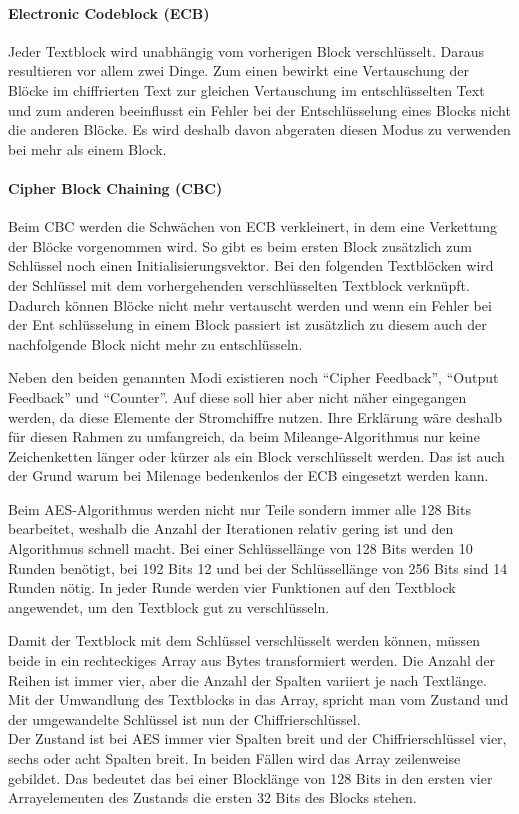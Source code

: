   \paragraph{Electronic Codeblock (ECB)}
   Jeder Textblock wird unabhängig vom vorherigen Block verschlüsselt. Daraus resultieren vor allem
   zwei Dinge. Zum einen bewirkt eine Vertauschung der Blöcke im chiffrierten Text zur gleichen Vertauschung
   im entschlüsselten Text und zum anderen beeinflusst ein Fehler bei der Entschlüsselung eines Blocks
   nicht die anderen Blöcke. Es wird deshalb davon abgeraten diesen Modus zu verwenden bei mehr
   als einem Block.

  \paragraph{Cipher Block Chaining (CBC)}
   Beim CBC werden die Schwächen von ECB verkleinert, in dem eine Verkettung der Blöcke vorgenommen
   wird. So gibt es beim ersten Block zusätzlich zum Schlüssel noch einen Initialisierungsvektor. Bei den
   folgenden Textblöcken wird der Schlüssel mit dem vorhergehenden verschlüsselten Textblock
   verknüpft. Dadurch können Blöcke nicht mehr vertauscht werden und wenn ein Fehler bei der Ent\-
   schlüsselung in einem Block passiert ist zusätzlich zu diesem auch der nachfolgende Block nicht mehr
   zu entschlüsseln.
   
  Neben den beiden genannten Modi existieren noch ``Cipher Feedback'', ``Output Feedback'' und
  ``Counter''. Auf diese soll hier aber nicht näher eingegangen werden, da diese Elemente der
  Stromchiffre nutzen. Ihre Erklärung wäre deshalb für diesen Rahmen zu umfangreich, da beim
  Mileange-Algorithmus nur keine Zeichenketten länger oder kürzer als ein Block verschlüsselt
  werden. Das ist auch der Grund warum bei Milenage bedenkenlos der ECB eingesetzt werden kann.
  
  Beim AES-Algorithmus werden nicht nur Teile sondern immer alle 128 Bits bearbeitet, weshalb die
  Anzahl der Iterationen relativ gering ist und den Algorithmus schnell macht. Bei einer Schlüssellänge
  von 128 Bits werden 10 Runden benötigt, bei 192 Bits 12 und bei der Schlüssellänge von 256 Bits
  sind 14 Runden nötig. In jeder Runde werden vier Funktionen auf den Textblock angewendet, um
  den Textblock gut zu verschlüsseln.
  
  Damit der Textblock mit dem Schlüssel verschlüsselt werden können, müssen beide in ein rechteckiges
  Array aus Bytes transformiert werden. Die Anzahl der Reihen ist immer vier, aber die Anzahl der Spalten
  variiert je nach Textlänge. Mit der Umwandlung des Textblocks in das Array, spricht man vom Zustand
  und der umgewandelte Schlüssel ist nun der Chiffrierschlüssel. \\
  Der Zustand ist bei AES immer vier Spalten breit und der Chiffrierschlüssel vier, sechs oder acht Spalten
  breit. In beiden Fällen wird das Array zeilenweise gebildet. Das bedeutet das bei einer Blocklänge von
  128 Bits in den ersten vier Arrayelementen des Zustands die ersten 32 Bits des Blocks stehen.
  
